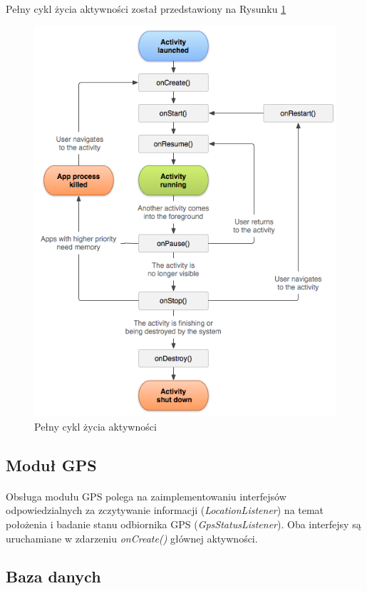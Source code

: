 \paragraph{} 
Pełny cykl życia aktywności został przedstawiony na Rysunku \ref{fig:activity_lifecycle}

\begin{figure}[ht]
	\centering
		\includegraphics[width=0.7\linewidth]{assets/activity_lifecycle.png}
		\caption{Pełny cykl życia aktywności}
	\label{fig:activity_lifecycle}
\end{figure}

\subsection{Moduł GPS} %
\label{sub:modu_gps}

\paragraph{} %
\label{par:}
Obsługa modułu GPS polega na zaimplementowaniu interfejsów odpowiedzialnych za zczytywanie informacji (\textit{LocationListener}) na temat położenia i badanie stanu odbiornika GPS (\textit{GpsStatusListener}). Oba interfejsy są uruchamiane w zdarzeniu \textit{onCreate()} głównej aktywności. 

\subsection{Baza danych} %
\label{sub:baza_danych}
